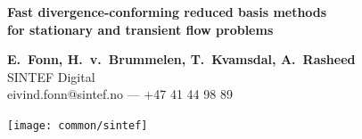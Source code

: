 \documentclass[a0,portrait]{a0poster}
\begin{document}
\begin{minipage}[b]{1.0\linewidth}
  \veryHuge \color{NavyBlue}
  \textbf{\noindent Fast divergence-conforming reduced basis methods \\ for stationary and transient flow problems}
  \color{Black}\\
\end{minipage}
\begin{minipage}[b]{0.7\linewidth}
  \huge \textbf{E.~Fonn, H.~v.~Brummelen, T.~Kvamsdal, A.~Rasheed}\\[0.5cm]
  \huge SINTEF Digital\\[0.4cm]
  \Large eivind.fonn@sintef.no --- +47 41 44 98 89\\
\end{minipage}
%
\begin{minipage}[b]{0.25\linewidth}
  \texttt{[image: common/sintef]}\\
\end{minipage}

\vspace{1cm}
\end{document}
